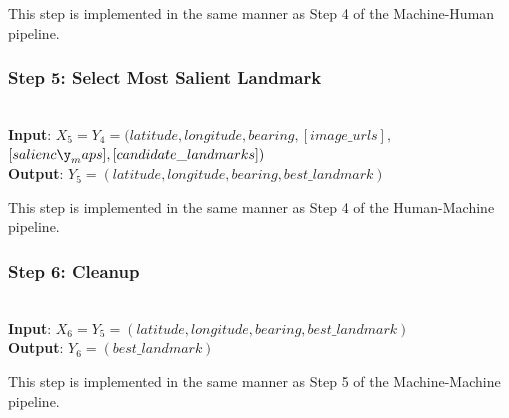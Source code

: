 This step is implemented in the same manner as Step 4 of the Machine-Human pipeline.

\subsubsection*{Step 5: Select Most Salient Landmark}~\\
\noindent\textbf{Input}: $X_5 = Y_4 = (latitude, longitude, bearing,  [image\_urls],$\\$ [salienc\y_maps], [candidate\_landmarks] )$\\
\textbf{Output}: $Y_5 = (latitude, longitude, bearing, best\_landmark)$
 
This step is implemented in the same manner as Step 4 of the Human-Machine pipeline.

\subsubsection*{Step 6: Cleanup}~\\
\noindent\textbf{Input}: $X_6 = Y_5 = (latitude, longitude, bearing, best\_landmark)$\\
\textbf{Output}: $Y_6 = (best\_landmark)$

This step is implemented in the same manner as Step 5 of the Machine-Machine pipeline.



